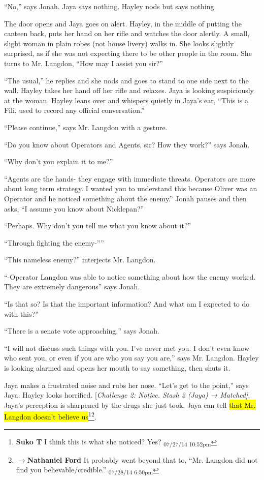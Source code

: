 ``No,'' says Jonah.  Jaya says nothing.  Hayley nods but says nothing.

The door opens and Jaya goes on alert.  Hayley, in the middle of putting the canteen back, puts her hand on her rifle and watches the door alertly.  A small, slight woman in plain robes (not house livery) walks in.  She looks slightly surprised, as if she was not expecting there to be other people in the room.  She turns to Mr. Langdon, ``How may I assist you sir?''

``The usual,'' he replies and she nods and goes to stand to one side next to the wall.  Hayley takes her hand off her rifle and relaxes.  Jaya is looking suspiciously at the woman.  Hayley leans over and whispers quietly in Jaya's ear, ``This is a Fili, used to record any official conversation.''

``Please continue,'' says Mr. Langdon with a gesture.

``Do you know about Operators and Agents, sir?  How they work?'' says Jonah.

``Why don't you explain it to me?''

``Agents are the hands- they engage with immediate threats.  Operators are more about long term strategy.   I wanted you to understand this because Oliver was an Operator and he noticed something about the enemy.''  Jonah pauses and then asks, ``I assume you know about Nicklepan?''

``Perhaps.  Why don't you tell me what you know about it?''

``Through fighting the enemy-''''

``This nameless enemy?'' interjects Mr. Langdon.

``-Operator Langdon was able to notice something about how the enemy worked.  They are extremely dangerous'' says Jonah.  

``Is that so?  Is that the important information?  And what am I expected to do with this?''

``There is a senate vote approaching,'' says Jonah.

``I will not discuss such things with you.  I've never met you.  I don't even know who sent you, or even if you are who you say you are,'' says Mr. Langdon.  Hayley is looking alarmed and opens her mouth to say something, then shuts it.

Jaya makes a frustrated noise and rubs her nose.  ``Let's get to the point,'' says Jaya.  Hayley looks horrified.  {[}\textit{Challenge 2:  Notice.  Stash 2 (Jaya) → Matched{]}}.  Jaya's perception is sharpened by the drugs she just took, Jaya can tell \hl{that Mr. Langdon doesn't believe us}\footnote{\textbf{Suko T }I think this is what she noticed?  Yes? \textsubscript{07/27/14 10:52pm}}\footnote{$\rightarrow$\textbf{Nathaniel Ford }It probably went beyond that to, ``Mr. Langdon did not find you believable/credible.'' \textsubscript{07/28/14 6:50pm}}.

